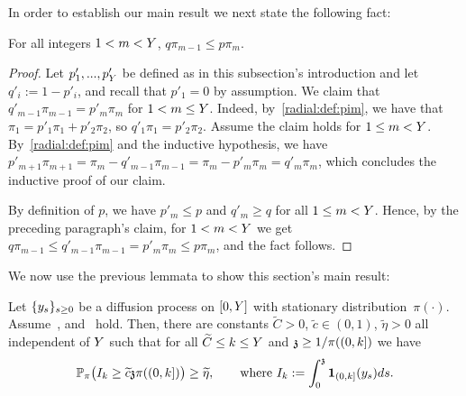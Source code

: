 	In order to establish our main result we next state the following fact: 
	\begin{fact}\label{fact:H1}
	For all integers $1 < m < \auxY$, $q \pi_{m-1} \le p \pi_{m}$.
	\end{fact}
	\begin{proof}
Let $p'_1,...,p'_{\auxY}$ be defined as in this subsection's introduction and let $q'_i:=1-p'_i$, and recall that $p'_1=0$ by assumption.
We claim that $q'_{m-1}\pi_{m-1}=p'_m\pi_m$ for $1< m \le \auxY$.
Indeed, by~\eqref{radial:def:pim}, we have that $\pi_1=p'_1\pi_1+p'_2\pi_2$, so $q'_1\pi_1=p'_2\pi_2$. Assume the claim holds for $1\le m<\auxY$. By~\eqref{radial:def:pim} and the inductive hypothesis, we have $p'_{m+1}\pi_{m+1}=\pi_m-q'_{m-1}\pi_{m-1}=\pi_m-p'_{m}\pi_{m}=q'_{m}\pi_{m}$, which concludes the inductive proof of our claim.

By definition of  $p$, we have $p'_m\le p$ and $q'_m\ge q$ for all $1\le m < \auxY$. Hence, by the preceding paragraph's claim, for $1<m<\auxY$ we get $q \pi_{m-1} \le q'_{m-1}\pi_{m-1}=p'_{m}\pi_{m} \le p \pi_m$, and the fact follows.
	\end{proof}
We now use the previous lemmata to show this section's main result:
\begin{proposition}\label{prop:coupling}
Let $\{\auxy_s\}_{s\geq 0}$ be a diffusion process on $[0,\auxY]$ with stationary distribution~$\pi(\cdot)$. Assume~,  and~ hold.
Then, there are constants $\widetilde{C}>0$, $\widetilde{c}\in (0,1)$, $\widetilde{\eta}> 0$ all independent of $\auxY$ such that for all 
 $\widetilde{C} \le k\leq \auxY$ and $\ss\geq 1/\pi((0,k])$ we have  
\[
\PP_\pi\big(I_k\geq \widetilde{c} \ss\pi((0,k])\big) \geq \widetilde{\eta},
	\qquad\text{where $I_k := \int_0^\ss {\bf 1}_{(0,k]}(\auxy_s)ds$.}
\]
\end{proposition}
